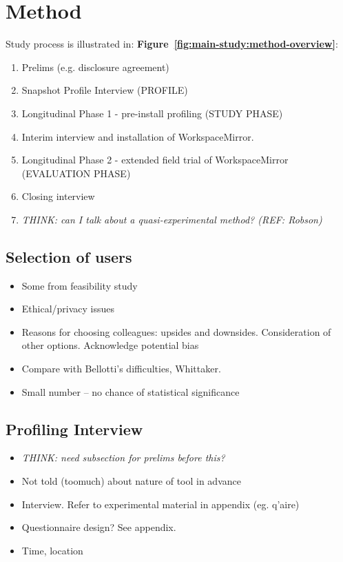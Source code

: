 		








\section{Method}
\label{main-study:method}

Study process is illustrated in: \textbf{Figure~\ref{fig:main-study:method-overview}}:
\begin{enumerate}
	\item Prelims (e.g. disclosure agreement)
	\item Snapshot Profile Interview (PROFILE)
	\item Longitudinal Phase 1 - pre-install profiling (STUDY PHASE)
	\item Interim interview and installation of WorkspaceMirror.
	\item Longitudinal Phase 2 - extended field trial of WorkspaceMirror (EVALUATION PHASE)
	\item Closing interview
	\item \textit{THINK: can I talk about a quasi-experimental method? (REF: Robson)}
\end{enumerate}

\subsection{Selection of users}
\begin{itemize}
	\item Some from feasibility study
	\item Ethical/privacy issues
	\item Reasons for choosing colleagues: upsides and downsides. Consideration of other options. Acknowledge potential bias 
	\item Compare with Bellotti's difficulties, Whittaker. 
	\item Small number -- no chance of statistical significance
\end{itemize}

\subsection{Profiling Interview}
\begin{itemize}
	\item \textit{THINK: need subsection for prelims before this?}
	\item Not told (toomuch) about nature of tool in advance
	\item Interview. Refer to experimental material in appendix (eg. q'aire)
	\item Questionnaire design?  See appendix.
	\item Time, location
\end{itemize}

